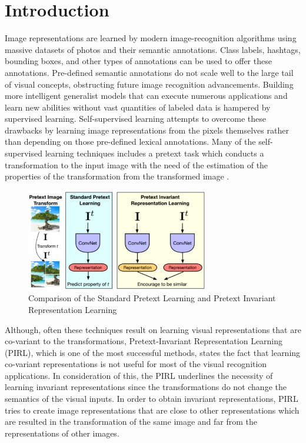 \documentclass[conference]{IEEEtran}
\begin{document}
\section{Introduction}
Image representations are learned by modern image-recognition algorithms using massive datasets of photos and their semantic annotations. Class labels, hashtags, bounding boxes, and other types of annotations can be used to offer these annotations. Pre-defined semantic annotations do not scale well to the large tail of visual concepts, obstructing future image recognition advancements. Building more intelligent generalist models that can execute numerous applications and learn new abilities without vast quantities of labeled data is hampered by supervised learning. Self-supervised learning attempts to overcome these drawbacks by learning image representations from the pixels themselves rather than depending on those pre-defined lexical annotations. Many of the self-supervised learning techniques includes a pretext task which conducts a transformation to the input image with the need of the estimation of the properties of the transformation from the transformed image \cite{PIRL, Multitask,SimCLR,gidaris,zhangir}. 

\begin{figure}[h]
\centerline{\includegraphics[width=8cm]{fig1.jpg}}
\caption{Comparison of the Standard Pretext Learning and Pretext Invariant Representation Learning \cite{PIRL}}
\label{fig}
\end{figure}

Although, often these techniques result on learning visual representations that are co-variant to the transformations, Pretext-Invariant Representation Learning (PIRL), which is one of the most successful methods, states the fact that learning co-variant representations is not useful for most of the visual recognition applications. In consideration of this, the PIRL underlines the necessity of learning invariant representations since the transformations do not change the semantics of the visual inputs. In order to obtain invariant representations, PIRL tries to create image representations that are close to other representations which are resulted in the transformation of the same image and far from the representations of other images.
\end{document}
